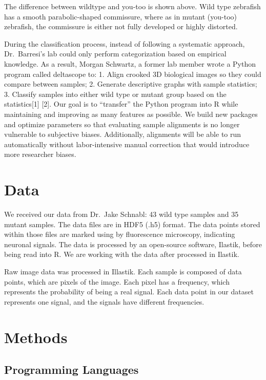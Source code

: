 \documentclass[10pt,letterpaper]{article}
\begin{document}
The difference between wildtype and you-too is shown above. Wild type
zebrafish has a smooth parabolic-shaped commissure, where as in mutant
(you-too) zebrafish, the commissure is either not fully developed or
highly distorted.

During the classification process, instead of following a systematic
approach, Dr.~Barresi's lab could only perform categorization based on
empirical knowledge. As a result, Morgan Schwartz, a former lab member
wrote a Python program called deltascope to: 1. Align crooked 3D
biological images so they could compare between samples; 2. Generate
descriptive graphs with sample statistics; 3. Classify samples into
either wild type or mutant group based on the statistics{[}1{]} {[}2{]}.
Our goal is to ``transfer'' the Python program into R while maintaining
and improving as many features as possible. We build new packages and
optimize parameters so that evaluating sample alignments is no longer
vulnerable to subjective biases. Additionally, alignments will be able
to run automatically without labor-intensive manual correction that
would introduce more researcher biases.

\hypertarget{data}{%
\section{Data}\label{data}}

We received our data from Dr.~Jake Schnabl: 43 wild type samples and 35
mutant samples. The data files are in HDF5 (.h5) format. The data points
stored within those files are marked using by fluorescence microscopy,
indicating neuronal signals. The data is processed by an open-source
software, Ilastik, before being read into R. We are working with the
data after processed in Ilastik.

Raw image data was processed in Illastik. Each sample is composed of
data points, which are pixels of the image. Each pixel has a frequency,
which represents the probability of being a real signal. Each data point
in our dataset represents one signal, and the signals have different
frequencies.

\hypertarget{methods}{%
\section{Methods}\label{methods}}

\hypertarget{programming-languages}{%
\subsection{Programming Languages}\label{programming-languages}}
\end{document}
